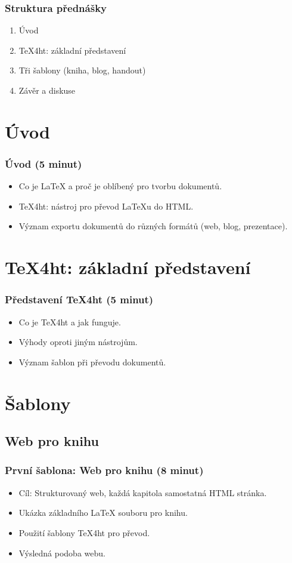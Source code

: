 \documentclass{beamer}
\begin{document}
\begin{frame}
\frametitle{Struktura přednášky}
\begin{enumerate}
    \item Úvod
    \item TeX4ht: základní představení
    \item Tři šablony (kniha, blog, handout)
    \item Závěr a diskuse
\end{enumerate}
\end{frame}

\section{Úvod}
\begin{frame}
\frametitle{Úvod (5 minut)}
\begin{itemize}
    \item Co je LaTeX a proč je oblíbený pro tvorbu dokumentů.
    \item TeX4ht: nástroj pro převod LaTeXu do HTML.
    \item Význam exportu dokumentů do různých formátů (web, blog, prezentace).
\end{itemize}
\end{frame}

\section{TeX4ht: základní představení}
\begin{frame}
\frametitle{Představení TeX4ht (5 minut)}
\begin{itemize}
    \item Co je TeX4ht a jak funguje.
    \item Výhody oproti jiným nástrojům.
    \item Význam šablon při převodu dokumentů.
\end{itemize}
\end{frame}

\section{Šablony}

\subsection{Web pro knihu}
\begin{frame}
\frametitle{První šablona: Web pro knihu (8 minut)}
\begin{itemize}
    \item Cíl: Strukturovaný web, každá kapitola samostatná HTML stránka.
    \item Ukázka základního LaTeX souboru pro knihu.
    \item Použití šablony TeX4ht pro převod.
    \item Výsledná podoba webu.
\end{itemize}
\end{frame}
\end{document}
